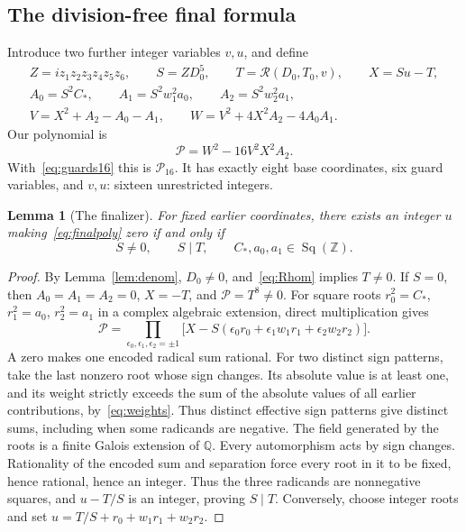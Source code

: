 \documentclass[11pt]{article}
\newtheorem{lemma}[theorem]{Lemma}
\theoremstyle{definition}\newtheorem{definition}[theorem]{Definition}
\newcommand{\Z}{\mathbb Z}\newcommand{\N}{\mathbb N}\newcommand{\Q}{\mathbb Q}
\newcommand{\Sq}{\operatorname{Sq}(\Z)}
\begin{document}
\subsection{The division-free final formula}
Introduce two further integer variables $v,u$, and define
\begin{gather*}
 Z=i z_1z_2z_3z_4z_5z_6,\qquad
 S=ZD_0^5,\qquad T=\mathscr R(D_0,T_0,v),\qquad X=Su-T,\\
 A_0=S^2C_*,\qquad A_1=S^2w_1^2a_0,\qquad A_2=S^2w_2^2a_1,\\
 V=X^2+A_2-A_0-A_1,\qquad
 W=V^2+4X^2A_2-4A_0A_1.
\end{gather*}
Our polynomial is
\begin{equation}\label{eq:finalpoly}
 \boxed{\mathcal P=W^2-16V^2X^2A_2.}
\end{equation}
With~\eqref{eq:guards16} this is $\mathcal P_{16}$. It has exactly eight base coordinates, six guard variables, and $v,u$: sixteen unrestricted integers.

\begin{lemma}[The finalizer]\label{lem:finalizer}
For fixed earlier coordinates, there exists an integer $u$ making~\eqref{eq:finalpoly} zero if and only if
\[
 S\ne0,\qquad S\mid T,\qquad C_*,a_0,a_1\in\Sq.
\]
\end{lemma}
\begin{proof}
By Lemma~\ref{lem:denom}, $D_0\ne0$, and~\eqref{eq:Rhom} implies $T\ne0$. If $S=0$, then $A_0=A_1=A_2=0$, $X=-T$, and $\mathcal P=T^8\ne0$.
For square roots $r_0^2=C_*$, $r_1^2=a_0$, $r_2^2=a_1$ in a complex algebraic extension, direct multiplication gives
\[
 \mathcal P=\prod_{\epsilon_0,\epsilon_1,\epsilon_2=\pm1}
 \bigl[X-S(\epsilon_0r_0+\epsilon_1w_1r_1+\epsilon_2w_2r_2)\bigr].
\]
A zero makes one encoded radical sum rational. For two distinct sign patterns, take the last nonzero root whose sign changes. Its absolute value is at least one, and its weight strictly exceeds the sum of the absolute values of all earlier contributions, by~\eqref{eq:weights}. Thus distinct effective sign patterns give distinct sums, including when some radicands are negative.
The field generated by the roots is a finite Galois extension of $\Q$. Every automorphism acts by sign changes. Rationality of the encoded sum and separation force every root in it to be fixed, hence rational, hence an integer. Thus the three radicands are nonnegative squares, and $u-T/S$ is an integer, proving $S\mid T$. Conversely, choose integer roots and set $u=T/S+r_0+w_1r_1+w_2r_2$.
\end{proof}
\end{document}

